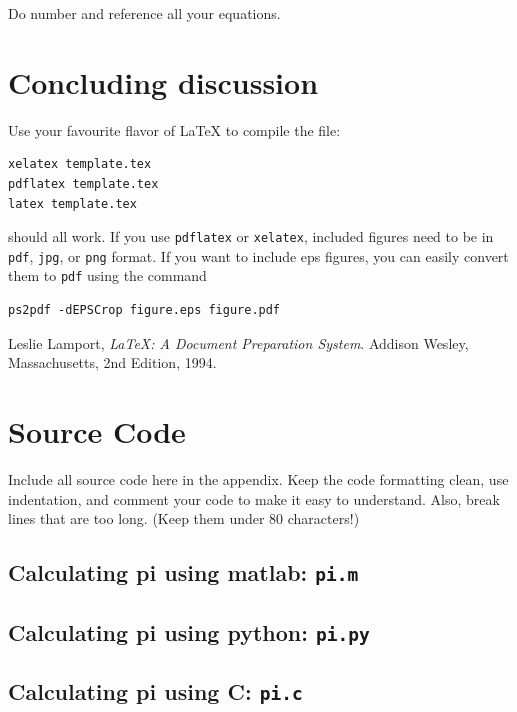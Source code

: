 Do number and reference all your equations.

\section*{Concluding discussion}

Use your favourite flavor of \LaTeX{} to compile the file:
\begin{verbatim}
xelatex template.tex
pdflatex template.tex
latex template.tex
\end{verbatim}
should all work.
If you use \verb+pdflatex+ or \verb+xelatex+, included figures need to be in
\verb+pdf+, \verb+jpg+, or \verb+png+ format. If you want to include eps
figures, you can easily convert them to \verb+pdf+ using the command
\begin{verbatim}
ps2pdf -dEPSCrop figure.eps figure.pdf
\end{verbatim}

\begin{thebibliography}{69}
 Leslie Lamport, \emph{\LaTeX: A Document Preparation
System}. Addison Wesley, Massachusetts, 2nd Edition, 1994.
\end{thebibliography}

\newpage

\appendix

\section{Source Code}

Include all source code here in the appendix. Keep the code formatting clean,
use indentation, and comment your code to make it easy to understand. Also,
break lines that are too long. (Keep them under 80 characters!)

\subsection{Calculating pi using matlab: \texttt{pi.m}}


\subsection{Calculating pi using python: \texttt{pi.py}}


\subsection{Calculating pi using C: \texttt{pi.c}}




